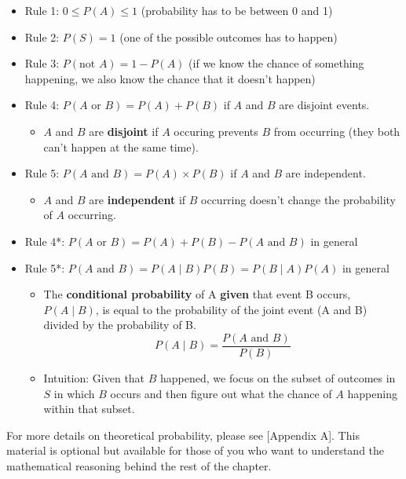 \documentclass[]{book}
\providecommand{\tightlist}{%
  \setlength{\itemsep}{0pt}\setlength{\parskip}{0pt}}
\begin{document}
\begin{itemize}
\tightlist
\item
  Rule 1: \(0\leq P(A)\leq 1\) (probability has to be between 0 and 1)
\item
  Rule 2: \(P(S) = 1\) (one of the possible outcomes has to happen)
\item
  Rule 3: \(P(\text{not }A) = 1 - P(A)\) (if we know the chance of something happening, we also know the chance that it doesn't happen)
\item
  Rule 4: \(P(A\text{ or }B) = P(A) + P(B)\) if \(A\) and \(B\) are disjoint events.

  \begin{itemize}
  \tightlist
  \item
    \(A\) and \(B\) are \textbf{disjoint} if \(A\) occuring prevents \(B\) from occurring (they both can't happen at the same time).
  \end{itemize}
\item
  Rule 5: \(P(A\text{ and }B) = P(A)\times P(B)\) if \(A\) and \(B\) are independent.

  \begin{itemize}
  \tightlist
  \item
    \(A\) and \(B\) are \textbf{independent} if \(B\) occurring doesn't change the probability of \(A\) occurring.
  \end{itemize}
\item
  Rule 4*: \(P(A\text{ or }B) = P(A) + P(B) - P(A\text{ and } B)\) in general
\item
  Rule 5*: \(P(A\text{ and }B) = P(A \mid B)P(B) = P(B \mid A)P(A)\) in general

  \begin{itemize}
  \tightlist
  \item
    The \textbf{conditional probability} of A \textbf{given} that event B occurs, \(P(A \mid B)\), is equal to the probability of the joint event (A and B) divided by the probability of B.
    \[ P(A \mid B) = \frac{P(A \text{ and } B)}{P(B)} \]
  \item
    Intuition: Given that \(B\) happened, we focus on the subset of outcomes in \(S\) in which \(B\) occurs and then figure out what the chance of \(A\) happening within that subset.
  \end{itemize}
\end{itemize}

For more details on theoretical probability, please see {[}Appendix A{]}. This material is optional but available for those of you who want to understand the mathematical reasoning behind the rest of the chapter.
\end{document}
